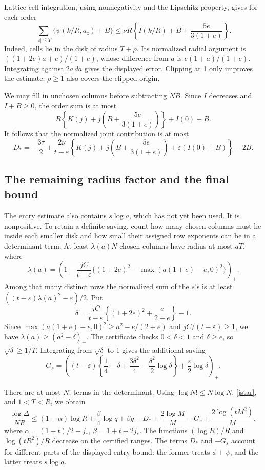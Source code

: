 \documentclass[11pt]{article}
\begin{document}
Lattice-cell integration, using nonnegativity and the Lipschitz property,
gives for each order
\[
 \sum_{|z|\le T}\{\psi(k/R,a_z)+B\}
 \le\nu R\left\{I(k/R)+B+\frac{5e}{3(1+e)}\right\}.
\]
Indeed, cells lie in the disk of radius \(T+\rho\). Its normalized
radial argument is \(((1+2e)a+e)/(1+e)\), whose difference from
\(a\) is \(e(1+a)/(1+e)\). Integrating against \(2a\,da\) gives
the displayed error. Clipping at 1 only improves the estimate;
\(\rho\ge1\) also covers the clipped origin.

We may fill in unchosen columns before subtracting \(NB\).
Since \(I\) decreases and \(I+B\ge0\), the order sum is at most
\[
 R\left\{K(j)+j\left(B+\frac{5e}{3(1+e)}\right)\right\}+I(0)+B.
\]
It follows that the normalized joint contribution is at most
\begin{equation}\label{Djoint}
 D_*=-\frac{3\tau}2+
 \frac{2\nu}{t-\varepsilon}
 \left\{K(j)+j\left(B+\frac{5e}{3(1+e)}\right)
                  +\varepsilon(I(0)+B)\right\}-2B.
\end{equation}

\subsection{The remaining radius factor and the final bound}
The entry estimate also contains \(s\log a\), which has not yet been
used. It is nonpositive. To retain a definite saving, count how many
chosen columns must lie inside each smaller disk and how small their
assigned row exponents can be in a determinant term.
At least \(\lambda(a)N\) chosen columns have radius at most \(aT\), where
\[
 \lambda(a)=\left(1-\frac{jC}{t-\varepsilon}
   \{(1+2e)^2-\max(a(1+e)-e,0)^2\}\right)_+.
\]
Among that many distinct rows the normalized sum of the \(s\)'s is
at least \(((t-\varepsilon)\lambda(a)^2-\varepsilon)/2\).
Put
\[
 \delta=\frac{jC}{t-\varepsilon}
       \left\{(1+2e)^2+\frac e{2+e}\right\}-1.
\]
Since \(\max(a(1+e)-e,0)^2\ge a^2-e/(2+e)\) and
\(jC/(t-\varepsilon)\ge1\), we have
\(\lambda(a)\ge(a^2-\delta)_+\).
The certificate checks \(0<\delta<1\) and \(\delta\ge e\), so
\(\sqrt\delta\ge1/T\). Integrating from \(\sqrt\delta\) to 1 gives
the additional saving
\begin{equation}\label{Gs}
 G_s=\left((t-\varepsilon)
       \left\{\frac14-\delta+\frac{3\delta^2}4
                    -\frac{\delta^2}2\log\delta\right\}
                     +\frac\varepsilon2\log\delta\right)_+.
\end{equation}

There are at most \(N!\) terms in the determinant. Using
\(\log N!\le N\log N\), \eqref{jstar}, and \(1<T<R\), we obtain
\begin{equation}\label{arch-final}
 \frac{\log\Delta}{NR}\le
 (1-\alpha)\log R+\frac\beta4\log q+\beta g
       +D_*+\frac{2\log M}{M}-G_s+\frac{2\log(tM^2)}M,
\end{equation}
where
\(\alpha=(1-t)/2-j_*\), \(\beta=1+t-2j_*\).
The functions \((\log R)/R\) and \(\log(tR^2)/R\) decrease on the
certified ranges. The terms \(D_*\) and \(-G_s\) account for different
parts of the displayed entry bound: the former treats
\(\phi+\psi\), and the latter treats \(s\log a\).
\end{document}
